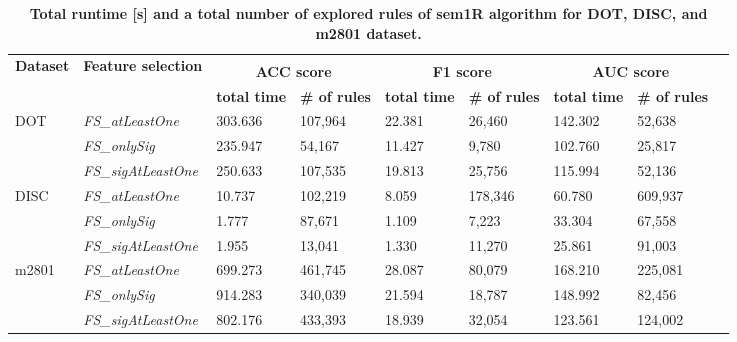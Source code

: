 \documentclass{bmcart}
\begin{document}
\begin{backmatter}
\begin{table}[h!]
\centering
\caption{
{\bf Total runtime [s] and a total number of explored rules of sem1R algorithm for DOT, DISC, and m2801 dataset.}}\label{tab:runtimes_short_sem1r}
\begin{tabular}{|l|l|l|l|l|l|l|l|l|}
\hline
  \multirow{3}{*}{{\bf Dataset}} & \multirow{3}{*}{{\bf Feature selection}} & \multicolumn{6}{c|}{} \\
  & & \multicolumn{2}{c|}{{\bf ACC score}} & \multicolumn{2}{c|}{{\bf F1 score}} & \multicolumn{2}{c|}{{\bf AUC score}}\\
   & & {\bf total time} & {\bf \# of rules} & {\bf total time} & {\bf \# of rules} & {\bf total time} & {\bf \# of rules} \\ \hline
\multirow{3}{*}{DOT} & \emph{FS\_atLeastOne} & 303.636
 & 107,964 & 22.381 & 26,460 & 142.302 & 52,638 \\ \cline{2-8}
 &  \emph{FS\_onlySig}&  235.947 & 54,167 & 11.427 & 9,780 & 102.760 & 25,817 \\ \cline{2-8}
 & \emph{FS\_sigAtLeastOne} & 250.633 & 107,535 & 19.813 & 25,756 & 115.994 & 52,136 \\ \hline
\multirow{3}{*}{DISC} & \emph{FS\_atLeastOne} & 10.737 & 102,219 & 8.059 & 178,346 & 60.780 & 609,937 \\ \cline{2-8}
 & \emph{FS\_onlySig} & 1.777 & 87,671 & 1.109 & 7,223 & 33.304 & 67,558 \\ \cline{2-8}
 & \emph{FS\_sigAtLeastOne} & 1.955 & 13,041 & 1.330 & 11,270 & 25.861 & 91,003 \\ \hline
\multirow{3}{*}{m2801} & \emph{FS\_atLeastOne} & 699.273 & 461,745 & 28.087 & 80,079 & 168.210 & 225,081 \\ \cline{2-8}
 & \emph{FS\_onlySig} & 914.283 & 340,039 & 21.594 & 18,787 & 148.992 & 82,456 \\ \cline{2-8}
 & \emph{FS\_sigAtLeastOne} & 802.176 & 433,393 & 18.939 & 32,054 & 123.561 & 124,002 \\ \hline
\end{tabular}
\end{table}


\end{backmatter}
\end{document}
